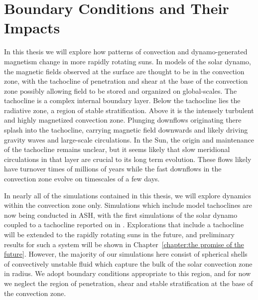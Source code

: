 \section{Boundary Conditions and Their Impacts}


In this thesis we will explore how patterns of convection and
dynamo-generated magnetism change in more rapidly rotating suns.  In
models of the solar dynamo, the magnetic fields observed at the
surface are thought to be in the convection zone, with the tachocline
of penetration and shear at the base of the convection zone possibly
allowing field to be stored and organized on global-scales.  The
tachocline is a complex internal boundary layer.  Below the tachocline
lies the radiative zone, a region of stable stratification.  Above it
is the intensely turbulent and highly magnetized convection zone.
Plunging downflows originating there splash into the tachocline,
carrying magnetic field downwards and likely driving gravity waves and
large-scale circulations.  In the Sun, the origin and maintenance of
the tachocline remains unclear, but it seems likely that slow
meridional circulations in that layer are crucial to its long term
evolution.  These flows likely have turnover times of millions of
years while the fast downflows in the convection zone evolve on
timescales of a few days.

In nearly all of the simulations contained in this thesis, we will
explore dynamics within the convection zone only.  
Simulations which include model tachoclines are now being conducted in
ASH, with the first simulations of the solar dynamo coupled to a
tachocline reported on in \cite{Browning_et_al_2006}.  Explorations
that include a tachocline will be extended to the rapidly rotating
suns in the future, and preliminary results for such a system will be
shown in Chapter~\ref{chapter:the promise of the future}.  However,
the majority of our simulations here consist of spherical shells of 
convectively unstable fluid which capture the bulk of the solar
convection zone in radius.  We adopt boundary conditions appropriate
to this region, and for now we neglect the region of penetration, shear
and stable stratification at the base of the convection zone.
 
